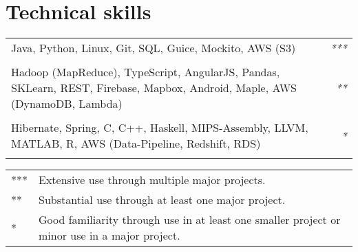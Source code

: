 \documentclass[11pt,a4paper]{article}
\begin{document}
\section*{Technical skills}
\begin{tabularx}{\textwidth}{X r}
    Java, Python, Linux, Git, SQL, Guice, Mockito, AWS (S3)
    & \textit{***} \\\\

    Hadoop (MapReduce), TypeScript, AngularJS, Pandas, SKLearn, REST, Firebase, Mapbox, Android, Maple, AWS (DynamoDB, Lambda)
    & \textit{**} \\\\

    Hibernate, Spring, C, C++, Haskell, MIPS-Assembly, LLVM, MATLAB, R, AWS (Data-Pipeline, Redshift, RDS)
    & \textit{*} \\\\
\end{tabularx}
\begin{tiny}{}
\begin{tabular}{l l}
    *** & Extensive use through multiple major projects. \\
    ** & Substantial use through at least one major project. \\
    * & Good familiarity through use in at least one smaller project or minor use in a major project.
\end{tabular}
\end{tiny}


\end{document}
